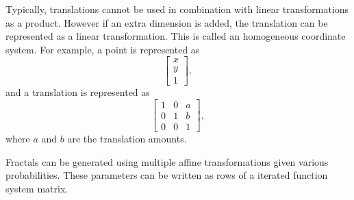 \documentclass{article}
\begin{document}
    Typically, translations cannot be used in combination with linear transformations as a product.
    However if an extra dimension is added, the translation can be represented as a linear transformation.
    This is called an homogeneous coordinate system. 
    For example, a point is represented as 
    \[
    \begin{bmatrix}
        x \\
        y \\
        1
    \end{bmatrix},
    \]
    and a translation is represented as
    \[
    \begin{bmatrix}
        1 & 0 & a \\
        0 & 1 & b \\
        0 & 0 & 1
    \end{bmatrix},
    \]
    where $a$ and $b$ are the translation amounts.

    Fractals can be generated using multiple affine transformations given various probabilities. 
    These parameters can be written as rows of a iterated function system matrix. 
\end{document}
